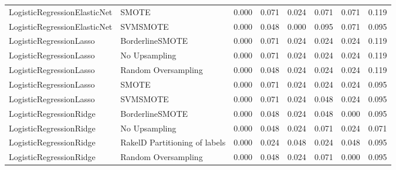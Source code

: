 \begin{tabular}{llllllll}
   LogisticRegressionElasticNet &                         SMOTE & 0.000 &                     0.071 &                 0.024 &                  0.071 &                                   0.071 &     0.119 \\
   LogisticRegressionElasticNet &                      SVMSMOTE & 0.000 &                     0.048 &                 0.000 &                  0.095 &                                   0.071 &     0.095 \\
        LogisticRegressionLasso &               BorderlineSMOTE & 0.000 &                     0.071 &                 0.024 &                  0.024 &                                   0.024 &     0.119 \\
        LogisticRegressionLasso &                 No Upsampling & 0.000 &                     0.071 &                 0.024 &                  0.024 &                                   0.024 &     0.119 \\
        LogisticRegressionLasso &           Random Oversampling & 0.000 &                     0.048 &                 0.024 &                  0.024 &                                   0.024 &     0.119 \\
        LogisticRegressionLasso &                         SMOTE & 0.000 &                     0.071 &                 0.024 &                  0.024 &                                   0.024 &     0.095 \\
        LogisticRegressionLasso &                      SVMSMOTE & 0.000 &                     0.071 &                 0.024 &                  0.048 &                                   0.024 &     0.095 \\
        LogisticRegressionRidge &               BorderlineSMOTE & 0.000 &                     0.048 &                 0.024 &                  0.048 &                                   0.000 &     0.095 \\
        LogisticRegressionRidge &                 No Upsampling & 0.000 &                     0.048 &                 0.024 &                  0.071 &                                   0.024 &     0.071 \\
        LogisticRegressionRidge & RakelD Partitioning of labels & 0.000 &                     0.024 &                 0.048 &                  0.024 &                                   0.048 &     0.095 \\
        LogisticRegressionRidge &           Random Oversampling & 0.000 &                     0.048 &                 0.024 &                  0.071 &                                   0.000 &     0.095 \\

\end{tabular}
